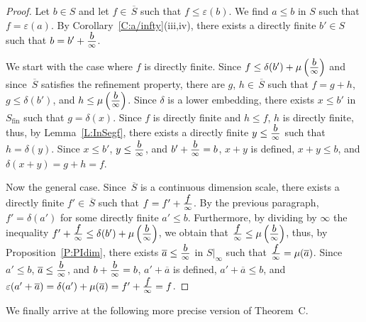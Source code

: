 \documentclass[psamsfonts,reqno]{memo-l}
\theoremstyle{plain}
\theoremstyle{definition}
\theoremstyle{remark}
\numberwithin{equation}{section}
\newcommand{\eps}{\varepsilon}
\newcommand{\ol}[1]{\,\overline{\!#1}}
\newcommand{\oll}[1]{\overline{#1}}
\newcommand{\di}[1]{\tfrac{\mathstrut\textstyle{#1}}{\scriptstyle{\infty}}}
\newcommand{\DI}[1]{#1|_{\infty}}
\newcommand{\pdi}[1]{\left(\di{#1}\right)}
\newcommand{\fin}{\mathrm{fin}}
\begin{document}
\begin{proof}
Let $b\in S$ and let $f\in\ol{S}$ such that $f\leq\eps(b)$. We find
$a\leq b$ in $S$ such that $f=\eps(a)$.
By Corollary~\ref{C:a/infty}(iii,iv), there exists a directly finite
 $b'\in S$ such that $b=b'+\di{b}$.

We start with the case where $f$ is directly finite.
Since
$f\leq\delta(b')+\mu\pdi{b}$ and since $\ol{S}$ satisfies the refinement
property, there are $g$, $h\in\ol{S}$ such that $f=g+h$, $g\leq\delta(b')$, and
$h\leq\mu\pdi{b}$. Since $\delta$ is a lower embedding, there exists
$x\leq b'$ in $S_\fin$ such that $g=\delta(x)$. Since $f$
is directly finite and $h\leq f$, $h$ is directly
finite, thus, by Lemma~\ref{L:InSegf}, there exists a directly finite
$y\leq\di{b}$ such that
$h=\delta(y)$. Since
$x\leq b'$, $y\leq\di{b}$, and $b'+\di{b}=b$, $x+y$ is defined, $x+y\leq b$,
and $\delta(x+y)=g+h=f$.

Now the general case. Since $\ol{S}$ is a continuous dimension scale, there exists a directly finite
$f'\in\ol{S}$ such that
$f=f'+\di{f}$. By the previous paragraph, $f'=\delta(a')$ for some directly
finite $a'\leq b$. Furthermore, by dividing by
$\infty$ the inequality
$f'+\di{f}\leq\delta(b')+\mu\pdi{b}$, we obtain that $\di{f}\leq\mu\pdi{b}$,
thus, by Proposition~\ref{P:PIdim}, there exists $\oll{a}\leq\di{b}$ in
$\DI{S}$ such that
$\di{f}=\mu(\oll{a})$. Since $a'\leq b$, $\oll{a}\leq\di{b}$, and
$b+\di{b}=b$, $a'+\oll{a}$ is defined, $a'+\oll{a}\leq b$, and
$\eps(a'+\oll{a})=\delta(a')+\mu(\oll{a})=f'+\di{f}=f$.
\end{proof}

We finally arrive at the following more precise version of Theorem~C.
\end{document}
